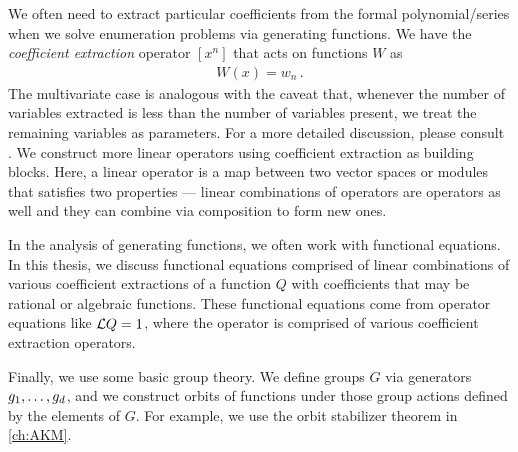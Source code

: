We often need to extract particular coefficients from the formal polynomial/series when we solve enumeration problems via generating functions. We have the \textit{coefficient extraction} operator $[x^n]$ that acts on functions $W$ as
\begin{align}
	[x^n] W(x) = w_n\,.
\end{align}
The multivariate case is analogous with the caveat that, whenever the number of variables extracted is less than the number of variables present, we treat the remaining variables as parameters. For a more detailed discussion, please consult \cite{goulden2004comb}. We construct more linear operators using coefficient extraction as building blocks. Here, a linear operator is a map between two vector spaces or modules that satisfies two properties --- linear combinations of operators are operators as well and they can combine via composition to form new ones.

In the analysis of generating functions, we often work with functional equations. In this thesis, we discuss functional equations comprised of linear combinations of various coefficient extractions of a function $Q$ with coefficients that may be rational or algebraic functions. These functional equations come from operator equations like $\mathcal{L} Q = 1$, where the operator is comprised of various coefficient extraction operators.

Finally, we use some basic group theory. We define groups $G$ via generators $g_1,\ldots, g_d$, and we construct orbits of functions under those group actions defined by the elements of $G$. For example, we use the orbit stabilizer theorem in \autoref{ch:AKM}.

\endinput


